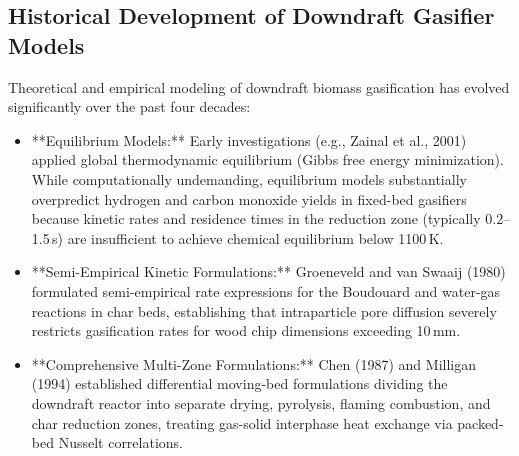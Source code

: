 \documentclass[11pt,a4paper]{article}
\begin{document}
\subsection{Historical Development of Downdraft Gasifier Models}
Theoretical and empirical modeling of downdraft biomass gasification has evolved significantly over the past four decades:
\begin{itemize}[leftmargin=1.5em]
    \item **Equilibrium Models:** Early investigations (e.g., Zainal et al., 2001) applied global thermodynamic equilibrium (Gibbs free energy minimization). While computationally undemanding, equilibrium models substantially overpredict hydrogen and carbon monoxide yields in fixed-bed gasifiers because kinetic rates and residence times in the reduction zone (typically 0.2--1.5\,s) are insufficient to achieve chemical equilibrium below 1100\,K.
    \item **Semi-Empirical Kinetic Formulations:** Groeneveld and van Swaaij (1980) formulated semi-empirical rate expressions for the Boudouard and water-gas reactions in char beds, establishing that intraparticle pore diffusion severely restricts gasification rates for wood chip dimensions exceeding 10\,mm.
    \item **Comprehensive Multi-Zone Formulations:** Chen (1987) and Milligan (1994) established differential moving-bed formulations dividing the downdraft reactor into separate drying, pyrolysis, flaming combustion, and char reduction zones, treating gas-solid interphase heat exchange via packed-bed Nusselt correlations.
\end{itemize}
\end{document}

